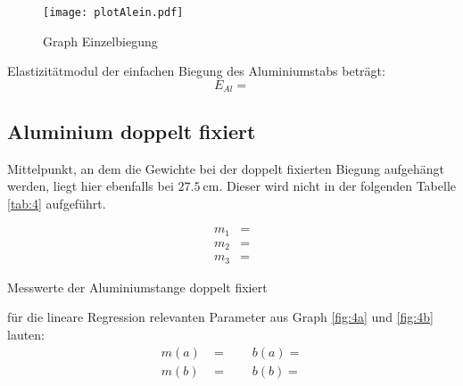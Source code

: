 \begin{figure}[H]
    \centering
    \texttt{[image: plotAlein.pdf]}
    \caption{Graph Einzelbiegung}
    \label{fig:3}
\end{figure}

\justifying Elastizitätmodul der einfachen Biegung des Aluminiumstabs beträgt:
\begin{equation}
E_{Al} =  \label{eq:}
\end{equation}


\subsection{Aluminium doppelt fixiert}\label{4.4}

\justifying Mittelpunkt, an dem die Gewichte bei der doppelt fixierten Biegung aufgehängt werden, liegt hier ebenfalls bei 
$\SI{27.5}{\centi\meter}$. Dieser wird nicht in der folgenden Tabelle \ref{tab:4} aufgeführt.

\begin{subequations}\label{eq:}
\begin{align}
    m_1 &= \text{} \label{eq:a}\\
    m_2 &= \text{} \label{eq:b}\\
    m_3 &= \text{} \label{eq:c}
\end{align}
\end{subequations}

\begin{table}[H]
    \centering
    
    \caption{Messwerte der Aluminiumstange doppelt fixiert}
    \label{tab:6}
\end{table}

\justifying für die lineare Regression relevanten Parameter aus Graph \ref{fig:4a} und \ref{fig:4b} lauten:
\begin{subequations}\label{eq:}
\begin{align}
    m(a) &= \text{} \qquad
    b(a) = \text{}\label{eq:a}\\
    m(b) &= \text{} \qquad
    b(b) = \text{}\label{eq:b}
\end{align}
\end{subequations}

